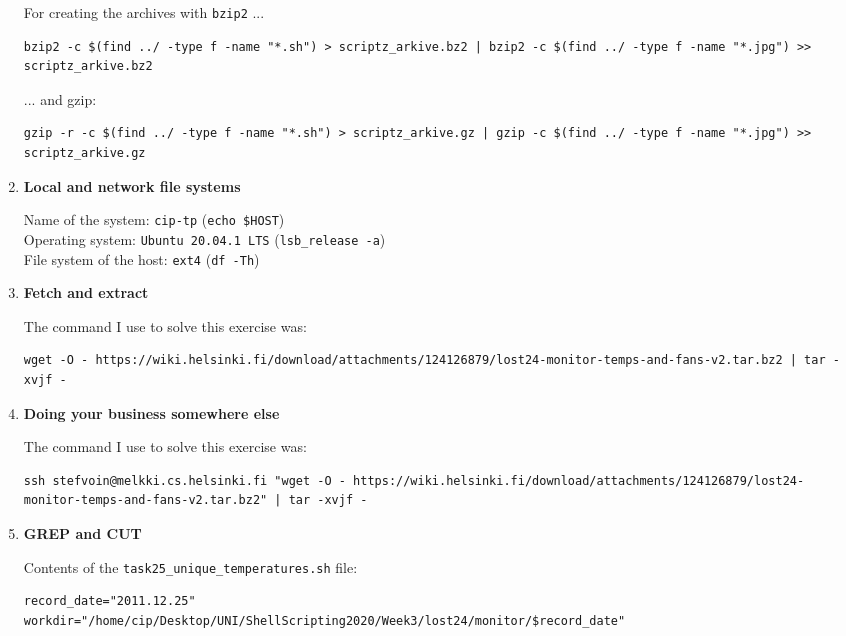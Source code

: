\documentclass[9pt]{article}
\begin{document}
\begin{enumerate}
        For creating the archives with \texttt{bzip2} ... 
        \begin{lstlisting}[breaklines=true]
bzip2 -c $(find ../ -type f -name "*.sh") > scriptz_arkive.bz2 | bzip2 -c $(find ../ -type f -name "*.jpg") >> scriptz_arkive.bz2
        \end{lstlisting}

        ... and gzip:
        \begin{lstlisting}[breaklines=true]
gzip -r -c $(find ../ -type f -name "*.sh") > scriptz_arkive.gz | gzip -c $(find ../ -type f -name "*.jpg") >> scriptz_arkive.gz
        \end{lstlisting}

    \item \textbf{Local and network file systems}
    
        Name of the system: \texttt{cip-tp} (\texttt{echo \$HOST})\\
        Operating system: \texttt{Ubuntu 20.04.1 LTS} (\texttt{lsb\_release -a})\\
        File system of the host: \texttt{ext4} (\texttt{df -Th})
        
    \item \textbf{Fetch and extract}
        
        The command I use to solve this exercise was:
        \begin{lstlisting}[breaklines=true]
wget -O - https://wiki.helsinki.fi/download/attachments/124126879/lost24-monitor-temps-and-fans-v2.tar.bz2 | tar -xvjf -
        \end{lstlisting}

    \item \textbf{Doing your business somewhere else}
    
        The command I use to solve this exercise was:
        \begin{lstlisting}[breaklines=true]
ssh stefvoin@melkki.cs.helsinki.fi "wget -O - https://wiki.helsinki.fi/download/attachments/124126879/lost24-monitor-temps-and-fans-v2.tar.bz2" | tar -xvjf -
        \end{lstlisting}
    
    \item \textbf{GREP and CUT}

        Contents of the \texttt{task25\_unique\_temperatures.sh} file:
        \begin{lstlisting}[breaklines=true]
record_date="2011.12.25"
workdir="/home/cip/Desktop/UNI/ShellScripting2020/Week3/lost24/monitor/$record_date"


\end{lstlisting}
\end{enumerate}
\end{document}
